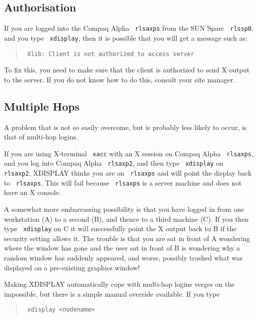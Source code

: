 \documentclass[twoside,11pt]{article}
\newcommand{\xlabel}[1]{}
\renewcommand{\_}{\texttt{\symbol{95}}}
\begin{document}
\subsection{\label{security}\xlabel{security}Authorisation}

If you are logged into the Compaq Alpha \texttt{ rlsaxps} from the
SUN Sparc \texttt{ rlssp0}, and you type \texttt{ xdisplay}, then it is possible
that you will get a message such as:

\begin{quote}\texttt{
Xlib:  Client is not authorized to access server
}
\end{quote}

To fix this, you need to make sure that the client is authorized to send X
output to the server.  If you do not know how to do this, consult your site
manager.

\subsection{\label{multihop}\xlabel{multihop}Multiple Hops}

A problem that is not so easily overcome, but is probably less likely
to occur, is that of multi-hop logins.

If you are using X-terminal \texttt{ xacc} with an X session on Compaq Alpha
\texttt{ rlsaxps},  and you log into Compaq Alpha \texttt{ rlsaxp2}, and then type
\texttt{ xdisplay} on \texttt{ rlsaxp2}, XDISPLAY thinks you are on \texttt{ rlsaxps}
and will point the display back to \texttt{ rlsaxps}.  This will fail because
\texttt{ rlsaxps} is a server machine and does not have an X console.

A somewhat more embarrassing possibility is that you have logged in from
 one workstation (A) to a second (B), and thence to a third machine
(C). If you then type \texttt{ xdisplay} on C it will successfully point
the X output back to B if the security setting allows it. The trouble
is that you are sat in front of A wondering where the window has gone
and the user sat in front of B is wondering why a random window has
suddenly appeared, and worse, possibly trashed what was displayed on
a pre-existing graphics window!

Making XDISPLAY automatically cope with multi-hop logins verges on the
impossible, but there is a simple manual override available. If you
type

\begin{quote}\texttt{
xdisplay <nodename>
}
\end{quote}
\end{document}
